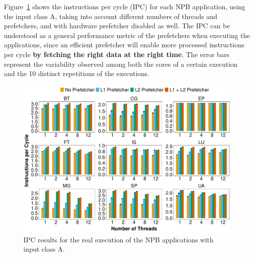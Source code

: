 \documentclass[AMA,final,STIX1COL]{WileyNJD-v2}
\newcommand\new[1]{{\color{red}\textbf{#1}}}
\newcommand{\ms}[1]{\textcolor{orange}{\bfseries \ul{ msserpa: #1} }\vspace{0.2cm}}
\newcommand{\vsg}[1]{\textcolor{blue}{\bfseries \ul{vsgirelli: #1} }\vspace{0.2cm}}
\newcommand{\fbm}[1]{\textcolor{red}{\bfseries \ul{fbm: #1} }\vspace{0.2cm}}
\begin{document}





Figure~\ref{fig:ipc} shows the instructions per cycle (IPC) for each NPB application, using the input class A, taking into account different numbers of threads and prefetchers, and with hardware prefetcher disabled as well. 
The IPC can be understood as a general performance metric of the prefetchers when executing the applications, since an efficient prefetcher will enable more processed instructions per cycle \new{by fetching the right data at the right time}. 
The error bars represent the variability observed among both the cores of a certain execution and the 10 distinct repetitions of the executions.

\begin{figure}[b]
    \centering
    \includegraphics[width=\linewidth]{figures/fig2.pdf}
    \caption{IPC results for the real execution of the NPB applications with input class A.}
    \label{fig:ipc}
\end{figure}
\end{document}
